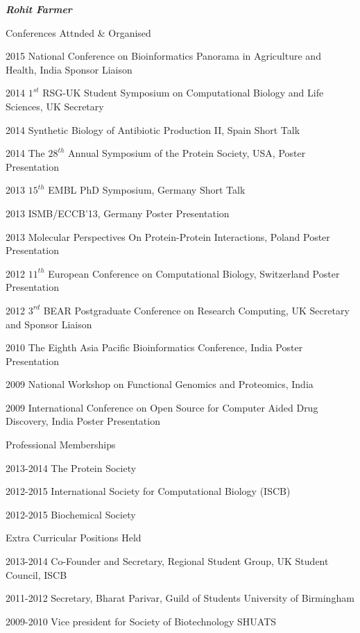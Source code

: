 \documentclass[10pt]{article}
\begin{document}
\begin{cv}{\huge \it \bfseries Rohit Farmer}
\vskip3pt
\begin{cvlist}{Conferences Attnded \& Organised}
	\item[2015] National Conference on Bioinformatics Panorama in Agriculture and Health, India \hfill Sponsor Liaison
	\item[2014] $1^{st}$ RSG-UK Student Symposium on Computational Biology and Life Sciences, UK \hfill Secretary
	\item[2014] Synthetic Biology of Antibiotic Production II, Spain \hfill Short Talk
	\item[2014] The $28^{th}$ Annual Symposium of the Protein Society, USA, \hfill Poster Presentation
	\item[2013] $15^{th}$ EMBL PhD Symposium, Germany \hfill Short Talk
	\item[2013] ISMB/ECCB'13, Germany \hfill Poster Presentation
	\item[2013] Molecular Perspectives On Protein-Protein Interactions, Poland \hfill Poster Presentation
	\item[2012] $11^{th}$ European Conference on Computational Biology, Switzerland \hfill Poster Presentation
	\item[2012] $3^{rd}$ BEAR Postgraduate Conference on Research Computing, UK \hfill Secretary and Sponsor Liaison
	\item[2010] The Eighth Asia Pacific Bioinformatics Conference, India \hfill Poster Presentation
	\item[2009] National Workshop on Functional Genomics and Proteomics, India
	\item[2009] International Conference on Open Source for Computer Aided Drug Discovery, India \hfill Poster Presentation
\end{cvlist}

\vskip3pt
\begin{cvlist}{Professional Memberships}
	\item[2013-2014] The Protein Society
	\item[2012-2015] International Society for Computational Biology (ISCB)
	\item[2012-2015] Biochemical Society
\end{cvlist}

\newpage
\begin{cvlist}{Extra Curricular Positions Held}
	\item[2013-2014] Co-Founder and Secretary, Regional Student Group, UK \hfill Student Council, ISCB
	\item[2011-2012] Secretary, Bharat Parivar, Guild of Students \hfill University of Birmingham
	\item[2009-2010] Vice president for Society of Biotechnology \hfill SHUATS
\end{cvlist}


\end{cv}
\end{document}
